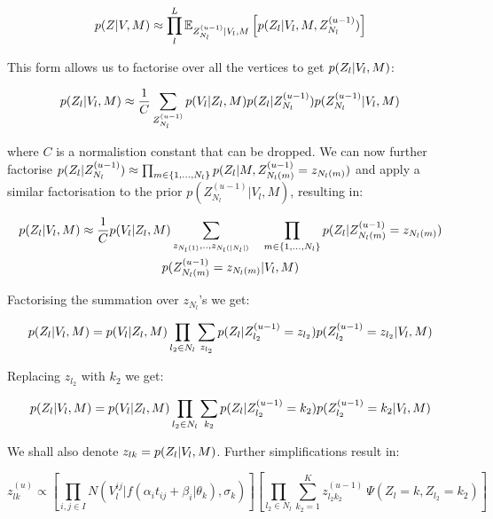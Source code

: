 \begin{equation}
\label{eq:app_e_approx}
 p(Z | V, M) \approx \prod_l^L \mathbb{E}_{Z_{N_l}^{(u-1)}|V_l, M} \left[ p(Z_l|V_l, M, Z_{N_l}^{(u-1)}) \right]
\end{equation}

This form allows us to factorise over all the vertices to get $p(Z_l | V_l, M)$:

\begin{equation}
 p(Z_l | V_l, M) \approx \frac{1}{C} \sum_{Z_{N_l}^{(u-1)}} p(V_l|Z_l, M) p(Z_l|Z_{N_l}^{(u-1)}) p(Z_{N_l}^{(u-1)}|V_l, M) 
\end{equation}

where $C$ is a normalistion constant that can be dropped. We can now  further factorise $p(Z_l|Z_{N_l}^{(u-1)}) \approx  \prod_{m \in \{1, ..., N_l\}} p(Z_l | M,  Z_{N_l(m)}^{(u-1)} = z_{N_l(m)})$ and apply a similar factorisation to the prior $p(Z_{N_l}^{(u-1)}|V_l, M) $, resulting in:

\begin{multline}
 p(Z_l | V_l, M) \approx \frac{1}{C} p(V_l|Z_l, M) \sum_{z_{N_l(1)}, .., z_{N_l(|N_l|)}}\ \ \  \prod_{m \in \{1, ..., N_l\}} p(Z_l | Z_{N_l(m)}^{(u-1)} = z_{N_l(m)}) \\ p(Z_{N_l(m)}^{(u-1)} = z_{N_l(m)}|V_l, M)
\end{multline}


Factorising the summation over $z_{N_l}$'s we get:

\begin{equation}
 p(Z_l | V_l, M) = p(V_l| Z_l, M)   \prod_{l_2 \in N_l} \sum_{z_{l_2}} p(Z_l | Z_{l_2}^{(u-1)} = z_{l_2}) p(Z_{l_2}^{(u-1)} = z_{l_2}|V_l, M)
\end{equation}

Replacing $z_{l_2}$ with $k_2$ we get:

\begin{equation}
 p(Z_l | V_l, M) = p(V_l| Z_l, M)   \prod_{l_2 \in N_l} \sum_{k_2} p(Z_l | Z_{l_2}^{(u-1)} = k_2) p(Z_{l_2}^{(u-1)} = k_2|V_l, M)
\end{equation}


We shall also denote $z_{lk} = p(Z_l | V_l, M)$. Further simplifications result in:

\begin{equation}
 z_{lk}^{(u)} \propto  \left[ \prod_{i,j \in I} N(V_l^{ij} | f(\alpha_i t_{ij} + \beta_i | \theta_k), \sigma_k) \right] \left[ \prod_{l_2 \in N_l} \sum_{k_2 = 1}^K z_{l_2k_2}^{(u-1)}\ \Psi (Z_{l} = k, Z_{l_2} = k_2) \right]
\end{equation}


